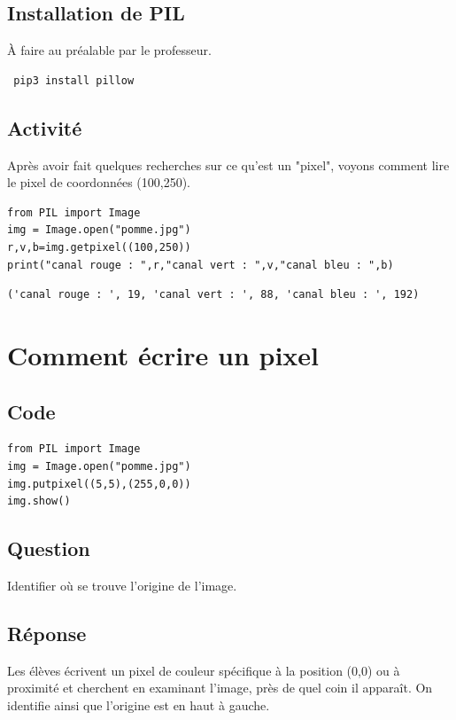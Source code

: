 \documentclass[11pt]{article}
\begin{document}
\subsection{Installation de PIL}
\label{sec:org0ccf2d2}

À faire au préalable par le professeur.

\begin{verbatim}
 pip3 install pillow
\end{verbatim}

\subsection{Activité}
\label{sec:orgb8adf38}

Après avoir fait quelques recherches sur ce qu'est un "pixel", voyons comment lire le pixel de coordonnées (100,250).

\begin{verbatim}
from PIL import Image
img = Image.open("pomme.jpg")
r,v,b=img.getpixel((100,250))
print("canal rouge : ",r,"canal vert : ",v,"canal bleu : ",b)
\end{verbatim}

\begin{verbatim}
('canal rouge : ', 19, 'canal vert : ', 88, 'canal bleu : ', 192)
\end{verbatim}


\section{Comment écrire un pixel}
\label{sec:org678fe6b}

\subsection{Code}
\label{sec:orgfda9eb3}

\begin{verbatim}
from PIL import Image
img = Image.open("pomme.jpg")
img.putpixel((5,5),(255,0,0))
img.show()
\end{verbatim}

\subsection{Question}
\label{sec:orgf7217d5}
Identifier où se trouve l'origine de l'image.

\subsection{Réponse}
\label{sec:org848c659}
Les élèves  écrivent un pixel de couleur spécifique à la position (0,0) ou à proximité et cherchent en examinant l'image, près de quel coin  il apparaît. On identifie ainsi que l'origine est en haut à gauche.
\end{document}
